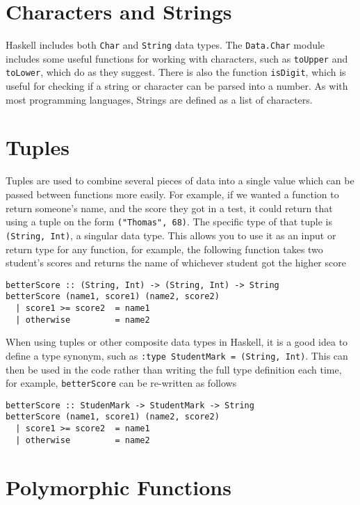 
\section*{Characters and Strings}

Haskell includes both \verb`Char` and \verb`String` data types. The \verb`Data.Char` module includes some useful
 functions for working with characters, such as \verb`toUpper` and \verb`toLower`, which do as they suggest. There is
 also the function \verb`isDigit`, which is useful for checking if a string or character can be parsed into a number.
 As with most programming languages, Strings are defined as a list of characters.

\section*{Tuples}

Tuples are used to combine several pieces of data into a single value which can be passed between functions more easily.
 For example, if we wanted a function to return someone's name, and the score they got in a test, it could return that
 using a tuple on the form \verb`("Thomas", 68)`. The specific type of that tuple is \verb`(String, Int)`, a singular
 data type. This allows you to use it as an input or return type for any function, for example, the following function
 takes two student's scores and returns the name of whichever student got the higher score
\begin{verbatim}
betterScore :: (String, Int) -> (String, Int) -> String
betterScore (name1, score1) (name2, score2)
  | score1 >= score2  = name1
  | otherwise         = name2
\end{verbatim}

When using tuples or other composite data types in Haskell, it is a good idea to define a type synonym, such as
 \verb`:type StudentMark = (String, Int)`. This can then be used in the code rather than writing the full type definition
 each time, for example, \verb`betterScore` can be re-written as follows
\begin{verbatim}
betterScore :: StudenMark -> StudentMark -> String
betterScore (name1, score1) (name2, score2)
  | score1 >= score2  = name1
  | otherwise         = name2
\end{verbatim}

\section*{Polymorphic Functions}

